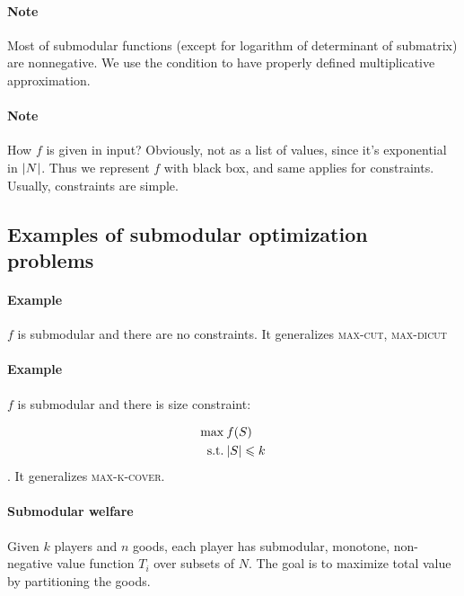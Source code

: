 \paragraph{Note} Most of submodular functions (except for logarithm of determinant of submatrix) are nonnegative. We use the condition to have properly defined multiplicative approximation.
\paragraph{Note} How $f$ is given in input? Obviously, not as a list of values, since it's exponential in $\abs{N}$. Thus we represent $f$ with black box, and same applies for constraints. Usually, constraints are simple. 

\subsection{Examples of submodular optimization problems}
\paragraph{Example}
$f$ is submodular and there are no constraints. It generalizes \textsc{max-cut}, \textsc{max-dicut}
\paragraph{Example}
$f$ is submodular and there is size constraint:

\begin{align}
\max \: & f(S)\\
\text{s.t.} \: & \abs{S} \leqslant k
\end{align}
. It generalizes \textsc{max-k-cover}.

\paragraph{Submodular welfare}
Given $k$ players and $n$ goods, each player has submodular, monotone, non-negative value function $T_i$ over subsets of $N$. The goal is to maximize total value by partitioning the goods.